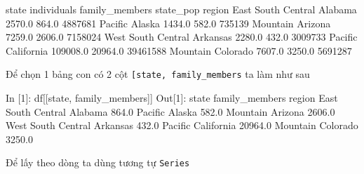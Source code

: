 \documentclass[
]{book}
\newenvironment{Shaded}{\begin{snugshade}}{\end{snugshade}}
\newcommand{\DecValTok}[1]{\textcolor[rgb]{0.00,0.00,0.81}{#1}}
\newcommand{\FloatTok}[1]{\textcolor[rgb]{0.00,0.00,0.81}{#1}}
\newcommand{\NormalTok}[1]{#1}
\newcommand{\StringTok}[1]{\textcolor[rgb]{0.31,0.60,0.02}{#1}}
\begin{document}
\begin{Shaded}
\begin{Highlighting}[]
\NormalTok{                         state  individuals  family\_members  state\_pop}
\NormalTok{region                                                                }
\NormalTok{East South Central     Alabama       }\FloatTok{2570.0}           \FloatTok{864.0}    \DecValTok{4887681}
\NormalTok{Pacific                 Alaska       }\FloatTok{1434.0}           \FloatTok{582.0}     \DecValTok{735139}
\NormalTok{Mountain               Arizona       }\FloatTok{7259.0}          \FloatTok{2606.0}    \DecValTok{7158024}
\NormalTok{West South Central    Arkansas       }\FloatTok{2280.0}           \FloatTok{432.0}    \DecValTok{3009733}
\NormalTok{Pacific             California     }\FloatTok{109008.0}         \FloatTok{20964.0}   \DecValTok{39461588}
\NormalTok{Mountain              Colorado       }\FloatTok{7607.0}          \FloatTok{3250.0}    \DecValTok{5691287}
\end{Highlighting}
\end{Shaded}

Để chọn 1 bảng con có 2 cột \texttt{{[}\textquotesingle{}state\textquotesingle{},\ \textquotesingle{}family\_members\textquotesingle{}{]}} ta làm như sau

\begin{Shaded}
\begin{Highlighting}[]
\NormalTok{In [}\DecValTok{1}\NormalTok{]: df[[}\StringTok{\textquotesingle{}state\textquotesingle{}}\NormalTok{, }\StringTok{\textquotesingle{}family\_members\textquotesingle{}}\NormalTok{]]}
\NormalTok{Out[}\DecValTok{1}\NormalTok{]:}
\NormalTok{                         state  family\_members}
\NormalTok{region                                        }
\NormalTok{East South Central     Alabama           }\FloatTok{864.0}
\NormalTok{Pacific                 Alaska           }\FloatTok{582.0}
\NormalTok{Mountain               Arizona          }\FloatTok{2606.0}
\NormalTok{West South Central    Arkansas           }\FloatTok{432.0}
\NormalTok{Pacific             California         }\FloatTok{20964.0}
\NormalTok{Mountain              Colorado          }\FloatTok{3250.0}
\end{Highlighting}
\end{Shaded}

Để lấy theo dòng ta dùng tương tự \texttt{Series}
\end{document}
